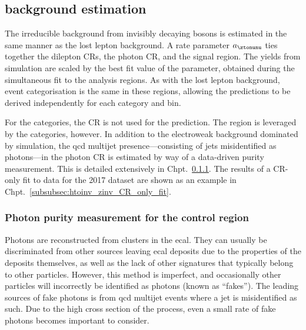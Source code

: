 

\subsection{\texorpdfstring{\ztonunupjets}{Z to nunu + jets} background estimation}
\label{subsubsec:htoinv_znunu_bkg}

The irreducible background from invisibly decaying \PZ bosons is estimated in the same manner as the lost lepton background. A rate parameter $a_{\ztonunu}$ ties together the dilepton \glspl{CR}, the photon \gls{CR}, and the signal region. The yields from simulation are scaled by the best fit value of the parameter, obtained during the simultaneous fit to the analysis regions. As with the lost lepton background, event categorisation is the same in these regions, allowing the predictions to be derived independently for each category and \ptmiss bin.

For the \ttH categories, the \singlePhotonCr \gls{CR} is not used for the \ztonunu prediction. The region is leveraged by the \VH categories, however. In addition to the electroweak background dominated by \gammapjets simulation, the \acrshort{qcd} multijet presence---consisting of \glspl{jet} misidentified as photons---in the photon \gls{CR} is estimated by way of a data-driven purity measurement. This is detailed extensively in Chpt.~\ref{subsubsec:htoinv_photon_purity}. The results of a \gls{CR}-only fit to data for the 2017 dataset are shown as an example in Chpt.~\ref{subsubsec:htoinv_zinv_CR_only_fit}.




\subsubsection{Photon purity measurement for the \texorpdfstring{\singlePhotonCr}{photon} control region}
\label{subsubsec:htoinv_photon_purity}

Photons are reconstructed from clusters in the \acrshort{ecal}. They can usually be discriminated from other sources leaving \acrshort{ecal} deposits due to the properties of the deposits themselves, as well as the lack of other signatures that typically belong to other particles. However, this method is imperfect, and occasionally other particles will incorrectly be identified as photons (known as ``fakes''). The leading sources of fake photons is from \acrshort{qcd} multijet events where a \gls{jet} is misidentified as such. Due to the high cross section of the process, even a small rate of fake photons becomes important to consider.


